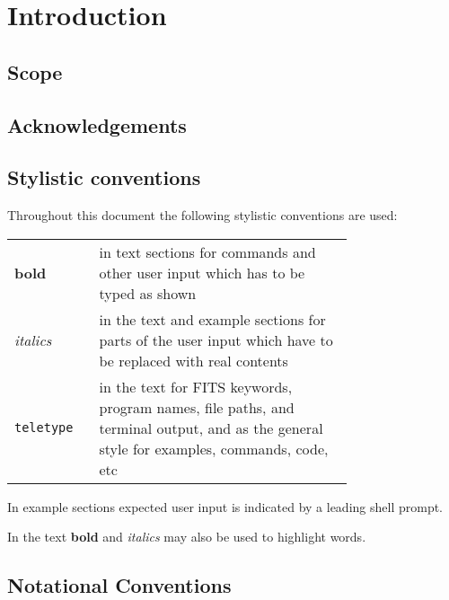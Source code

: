 \section{Introduction}
\label{sec:introduction}


\subsection{Scope}
\label{sec:scope}

\subsection{Acknowledgements}

\subsection{Stylistic conventions}
\label{sec:style}

Throughout this document the following stylistic conventions are used:

\begin{tabular}{lp{0.75\linewidth}}
\textbf{bold}     & in text sections for commands and other
                    user input which has to be typed as shown \\
\textit{italics}  & in the text and example sections for parts of the user
                    input which have to be replaced with real contents \\
\texttt{teletype} & in the text for FITS keywords, program names, file paths,
                    and terminal output, and as the general style for examples,
                    commands, code, etc \\
\end{tabular}

In example sections expected user input is indicated by a leading shell
prompt.

In the text \textbf{bold} and \textit{italics} may also be used to highlight
words.

\subsection{Notational Conventions}
\label{sec:notation}

